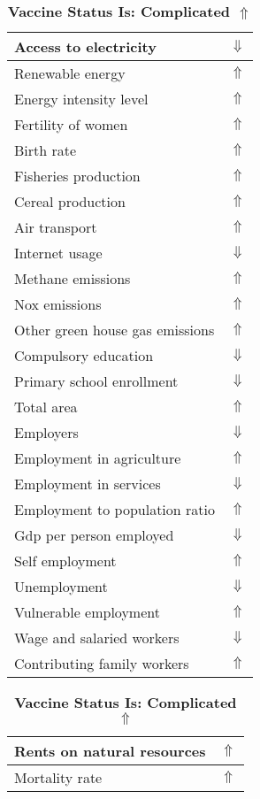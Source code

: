 \documentclass[12pt,notitlepage,oneside]{report}
\begin{document}
\begin{table}[!htb]
\caption{\textbf{Vaccine Status Is: Complicated $\Uparrow$}}
\centering
\label{Correlated Socio-economic Factors0}
\begin{tabular}{|l|l|}
\hline
Access to electricity & $\Downarrow$\\ \hline
Renewable energy & $\Uparrow$\\ \hline
Energy intensity level & $\Uparrow$\\ \hline
Fertility of women & $\Uparrow$\\ \hline
Birth rate & $\Uparrow$\\ \hline
Fisheries production & $\Uparrow$\\ \hline
Cereal production & $\Uparrow$\\ \hline
Air transport  & $\Uparrow$\\ \hline
Internet usage & $\Downarrow$\\ \hline
Methane emissions & $\Uparrow$\\ \hline
Nox emissions & $\Uparrow$\\ \hline
Other green house gas emissions & $\Uparrow$\\ \hline
Compulsory education & $\Downarrow$\\ \hline
Primary school enrollment & $\Downarrow$\\ \hline
Total area & $\Uparrow$\\ \hline
Employers & $\Downarrow$\\ \hline
Employment in agriculture & $\Uparrow$\\ \hline
Employment in services & $\Downarrow$\\ \hline
Employment to population ratio & $\Uparrow$\\ \hline
Gdp per person employed & $\Downarrow$\\ \hline
Self employment & $\Uparrow$\\ \hline
Unemployment & $\Downarrow$\\ \hline
Vulnerable employment & $\Uparrow$\\ \hline
Wage and salaried workers & $\Downarrow$\\ \hline
Contributing family workers & $\Uparrow$\\ \hline
\end{tabular}
\begin{tabular}{|l|l|}
\hline
Rents on natural resources & $\Uparrow$\\ \hline
Mortality rate & $\Uparrow$\\ \hline

\end{tabular}
\end{table}
\end{document}

